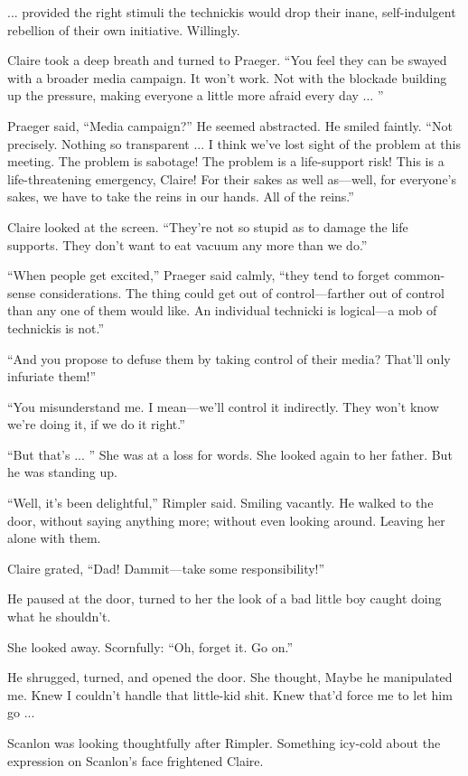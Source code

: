 ... provided the right stimuli the technickis would drop their inane, self-indulgent rebellion of their own initiative. Willingly.

Claire took a deep breath and turned to Praeger. ``You feel they can be swayed with a broader media campaign. It won't work. Not with the blockade building up the pressure, making everyone a little more afraid every day ... ''

Praeger said, ``Media campaign?'' He seemed abstracted. He smiled faintly. ``Not precisely. Nothing so transparent ... I think we've lost sight of the problem at this meeting. The problem is sabotage! The problem is a life-support risk! This is a life-threatening emergency, Claire! For their sakes as well as—well, for everyone's sakes, we have to take the reins in our hands. All of the reins.''

Claire looked at the screen. ``They're not so stupid as to damage the life supports. They don't want to eat vacuum any more than we do.''

``When people get excited,'' Praeger said calmly, ``they tend to forget common-sense considerations. The thing could get out of control—farther out of control than any one of them would like. An individual technicki is logical—a mob of technickis is not.''

``And you propose to defuse them by taking control of their media? That'll only infuriate them!''

``You misunderstand me. I mean—we'll control it indirectly. They won't know we're doing it, if we do it right.''

``But that's ... '' She was at a loss for words. She looked again to her father. But he was standing up.

``Well, it's been delightful,'' Rimpler said. Smiling vacantly. He walked to the door, without saying anything more; without even looking around. Leaving her alone with them.

Claire grated, ``Dad! Dammit—take some responsibility!''

He paused at the door, turned to her the look of a bad little boy caught doing what he shouldn't.

She looked away. Scornfully: ``Oh, forget it. Go on.''

He shrugged, turned, and opened the door. She thought, Maybe he manipulated me. Knew I couldn't handle that little-kid shit. Knew that'd force me to let him go ...

Scanlon was looking thoughtfully after Rimpler. Something icy-cold about the expression on Scanlon's face frightened Claire.

